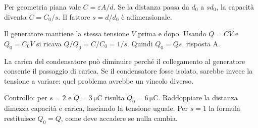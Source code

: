 \documentclass[11pt,a4paper]{article}
\begin{document}
\begin{samepage}
Per geometria piana vale \(C=\varepsilon A/d\). Se la distanza passa da \(d_0\) a \(sd_0\), la capacità diventa \(C=C_0/s\). Il fattore \(s=d/d_0\) è adimensionale.\par

Il generatore mantiene la stessa tensione \(V\) prima e dopo. Usando \(Q=CV\) e \(Q_0=C_0V\) si ricava \(Q/Q_0=C/C_0=1/s\). Quindi \(Q_0=Qs\), risposta A.\par

La carica del condensatore può diminuire perché il collegamento al generatore consente il passaggio di carica. Se il condensatore fosse isolato, sarebbe invece la tensione a variare: quel problema avrebbe un vincolo diverso.\par

Controllo: per \(s=2\) e \(Q=3\,\mathrm{\mu C}\) risulta \(Q_0=6\,\mathrm{\mu C}\). Raddoppiare la distanza dimezza capacità e carica, lasciando la tensione uguale. Per \(s=1\) la formula restituisce \(Q_0=Q\), come deve accadere se nulla cambia.\par

\end{samepage}
\newpage
\end{document}

